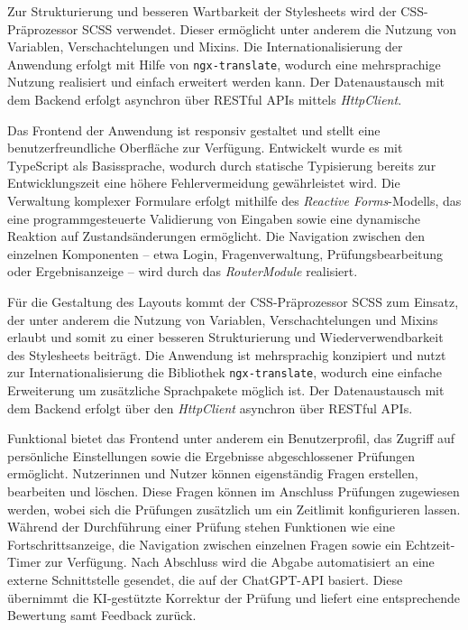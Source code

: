 \documentclass[a4paper,12pt]{article}
\begin{document}
Zur Strukturierung und besseren Wartbarkeit der Stylesheets wird der CSS-Präprozessor SCSS verwendet. Dieser ermöglicht unter anderem die Nutzung von Variablen, Verschachtelungen und Mixins. Die Internationalisierung der Anwendung erfolgt mit Hilfe von \texttt{ngx-translate}, wodurch eine mehrsprachige Nutzung realisiert und einfach erweitert werden kann. Der Datenaustausch mit dem Backend erfolgt asynchron über RESTful APIs mittels \textit{HttpClient}.

Das Frontend der Anwendung ist responsiv gestaltet und stellt eine benutzerfreundliche Oberfläche zur Verfügung. Entwickelt wurde es mit TypeScript als Basissprache, wodurch durch statische Typisierung bereits zur Entwicklungszeit eine höhere Fehlervermeidung gewährleistet wird. Die Verwaltung komplexer Formulare erfolgt mithilfe des \textit{Reactive Forms}-Modells, das eine programmgesteuerte Validierung von Eingaben sowie eine dynamische Reaktion auf Zustandsänderungen ermöglicht. Die Navigation zwischen den einzelnen Komponenten – etwa Login, Fragenverwaltung, Prüfungsbearbeitung oder Ergebnisanzeige – wird durch das \textit{RouterModule} realisiert.

Für die Gestaltung des Layouts kommt der CSS-Präprozessor SCSS zum Einsatz, der unter anderem die Nutzung von Variablen, Verschachtelungen und Mixins erlaubt und somit zu einer besseren Strukturierung und Wiederverwendbarkeit des Stylesheets beiträgt. Die Anwendung ist mehrsprachig konzipiert und nutzt zur Internationalisierung die Bibliothek \texttt{ngx-translate}, wodurch eine einfache Erweiterung um zusätzliche Sprachpakete möglich ist. Der Datenaustausch mit dem Backend erfolgt über den \textit{HttpClient} asynchron über RESTful APIs.

Funktional bietet das Frontend unter anderem ein Benutzerprofil, das Zugriff auf persönliche Einstellungen sowie die Ergebnisse abgeschlossener Prüfungen ermöglicht. Nutzerinnen und Nutzer können eigenständig Fragen erstellen, bearbeiten und löschen. Diese Fragen können im Anschluss Prüfungen zugewiesen werden, wobei sich die Prüfungen zusätzlich um ein Zeitlimit konfigurieren lassen. Während der Durchführung einer Prüfung stehen Funktionen wie eine Fortschrittsanzeige, die Navigation zwischen einzelnen Fragen sowie ein Echtzeit-Timer zur Verfügung. Nach Abschluss wird die Abgabe automatisiert an eine externe Schnittstelle gesendet, die auf der ChatGPT-API basiert. Diese übernimmt die KI-gestützte Korrektur der Prüfung und liefert eine entsprechende Bewertung samt Feedback zurück.
\end{document}
